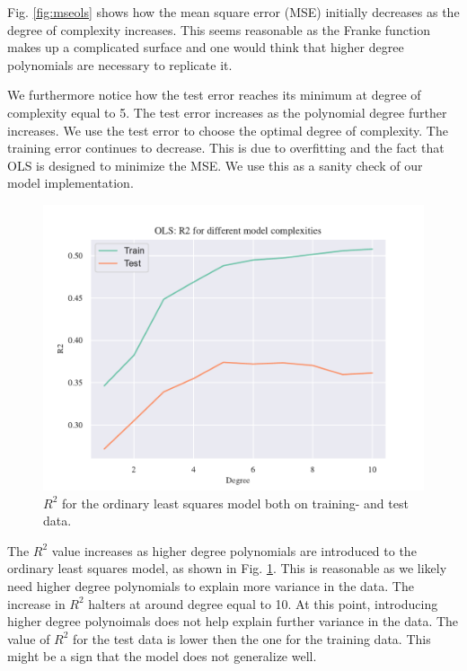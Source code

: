 Fig. \ref{fig:mseols} shows how the mean square error (MSE) initially decreases as the degree of complexity increases. This seems reasonable as the Franke function makes up a complicated surface and one would think that higher degree polynomials are necessary to replicate it. 

We furthermore notice how the test error reaches its minimum at degree of complexity equal to 5. The test error increases as the polynomial degree further increases. We use the test error to choose the optimal degree of complexity. The training error continues to decrease. This is due to overfitting and the fact that OLS is designed to minimize the MSE. We use this as a sanity check of our model implementation.

\begin{figure}[h!]
    \centering
    \includegraphics[width=1\linewidth]{project_1_alt/figures/figures_in_report/OLS_R2_Franke_Noise.pdf}
    \caption{$R^2$ for the ordinary least squares model both on training- and test data.}
    \label{fig:r2ols}
\end{figure}

The $R^2$ value increases as higher degree polynomials are introduced to the ordinary least squares model, as shown in Fig. \ref{fig:r2ols}. This is reasonable as we likely need higher degree polynomials to explain more variance in the data. The increase in $R^2$ halters at around degree equal to 10. At this point, introducing higher degree polynoimals does not help explain further variance in the data. The value of $R^2$ for the test data is lower then the one for the training data. This might be a sign that the model does not generalize well. 

